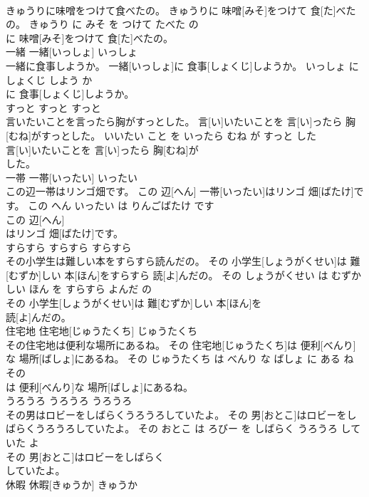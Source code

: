 \documentclass[8pt]{extreport}
\begin{document}
\begin{CJK}{UTF8}{min}
\\	きゅうりに味噌をつけて食べたの。	きゅうりに 味噌[みそ]をつけて 食[た]べたの。	きゅうり に みそ を つけて たべた の	
\\	に 味噌[みそ]をつけて 食[た]べたの。			
\\	一緒	一緒[いっしょ]	いっしょ	
\\	一緒に食事しようか。	一緒[いっしょ]に 食事[しょくじ]しようか。	いっしょ に しょくじ しよう か	
\\	に 食事[しょくじ]しようか。			
\\	すっと	すっと	すっと	
\\	言いたいことを言ったら胸がすっとした。	言[い]いたいことを 言[い]ったら 胸[むね]がすっとした。	いいたい こと を いったら むね が すっと した	
\\	言[い]いたいことを 言[い]ったら 胸[むね]が
\\	した。			
\\	一帯	一帯[いったい]	いったい	
\\	この辺一帯はリンゴ畑です。	この 辺[へん] 一帯[いったい]はリンゴ 畑[ばたけ]です。	この へん いったい は りんごばたけ です	
\\	この 辺[へん]
\\	はリンゴ 畑[ばたけ]です。			
\\	すらすら	すらすら	すらすら	
\\	その小学生は難しい本をすらすら読んだの。	その 小学生[しょうがくせい]は 難[むずか]しい 本[ほん]をすらすら 読[よ]んだの。	その しょうがくせい は むずかしい ほん を すらすら よんだ の	
\\	その 小学生[しょうがくせい]は 難[むずか]しい 本[ほん]を
\\	読[よ]んだの。			
\\	住宅地	住宅地[じゅうたくち]	じゅうたくち	
\\	その住宅地は便利な場所にあるね。	その 住宅地[じゅうたくち]は 便利[べんり]な 場所[ばしょ]にあるね。	その じゅうたくち は べんり な ばしょ に ある ね	
\\	その
\\	は 便利[べんり]な 場所[ばしょ]にあるね。			
\\	うろうろ	うろうろ	うろうろ	
\\	その男はロビーをしばらくうろうろしていたよ。	その 男[おとこ]はロビーをしばらくうろうろしていたよ。	その おとこ は ろびー を しばらく うろうろ して いた よ	
\\	その 男[おとこ]はロビーをしばらく
\\	していたよ。			
\\	休暇	休暇[きゅうか]	きゅうか	

\end{CJK}
\end{document}
